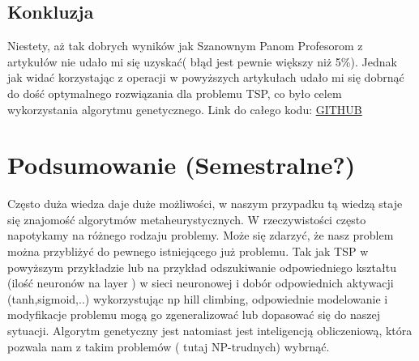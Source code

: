 \documentclass[11pt]{article}
\begin{document}
\subsection{Konkluzja}

Niestety, aż tak dobrych wyników jak Szanownym Panom Profesorom z artykułów nie udało mi się uzyskać( błąd jest pewnie większy niż 5\%). Jednak jak widać korzystając z operacji w powyższych artykułach udało mi się dobrnąć do dość optymalnego rozwiązania dla problemu TSP, co było celem wykorzystania algorytmu genetycznego. Link do całego kodu:
\href{https://github.com/sqoshi/metaheuristic-alghoritms/tree/master/population_based/genetic_algorithm_TSP}{GITHUB}
\section{Podsumowanie (Semestralne?)}
Często duża wiedza daje duże możliwości, w naszym przypadku tą wiedzą staje się znajomość algorytmów metaheurystycznych. W rzeczywistości często napotykamy na różnego rodzaju problemy. Może się zdarzyć, że nasz problem można przybliżyć do pewnego istniejącego już problemu. Tak jak TSP w powyższym przykładzie lub na przykład odszukiwanie odpowiedniego kształtu (ilość neuronów na layer ) w sieci neuronowej i dobór odpowiednich aktywacji (tanh,sigmoid,..) wykorzystując np hill climbing, odpowiednie modelowanie i modyfikacje problemu mogą go zgeneralizować lub dopasować się do naszej sytuacji. Algorytm genetyczny jest natomiast jest inteligencją obliczeniową, która pozwala nam z takim problemów ( tutaj NP-trudnych) wybrnąć.
\end{document}
